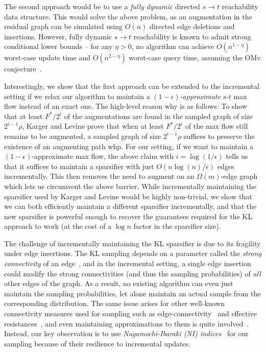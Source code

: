 \documentclass[11pt,a4paper]{article}
\newcommand{\eps}{\epsilon}
\begin{document}
The second approach would be to use a \emph{fully dynamic} directed $s\to t$ reachability data structure. This would solve the above problem, as  an augmentation in the residual graph can be simulated using $O(n)$ directed edge deletions and insertions. However, fully dynamic $s \to t$ reachability is known to admit strong conditional lower bounds -- for any $\eta > 0$, no algorithm can achieve $O(n^{1-\eta})$ worst-case update time and $O(n^{2-\eta})$ worst-case query time, assuming the OMv conjecture~\cite{HKNS15omv}.

Interestingly, we show that the first approach can be extended to the incremental setting if we relax our algorithm to maintain a \emph{$(1-\eps)$-approximate} $s$-$t$ max flow instead of an exact one.
The high-level reason why is as follows: To show that at least $F^*/2^i$ of the augmentations are found in the sampled graph of size $2^{i-1} \rho$, Karger and Levine prove that when at least $F^*/2^i$ of the max flow still remains to be augmented, a sampled graph of size $2^{i-1}\rho $ suffices to preserve the existence of an augmenting path whp. For our setting, if we want to maintain a $(1-\eps)$-approximate max flow, the above claim with $i = \log (1/\eps)$ tells us that it suffices to maintain a sparsifier with just $O(n \log (n) / \eps)$ edges incrementally.
This then removes the need to augment on an $\Omega(m)$-edge graph which lets us circumvent the above barrier.
While incrementally maintaining the sparsifier used by Karger and Levine would be highly non-trivial, we show that we can both efficiently maintain a different sparsifier incrementally, and that the new sparsifier is powerful enough to recover the guarantees required for the KL approach to work (at the cost of a $\log n$ factor in the sparsifier size).

The challenge of incrementally maintaining the KL sparsifier is due to its fragility under edge insertions. The KL sampling depends on a parameter called the \emph{strong connectivity} of an edge~\cite{BK15sampling}, and in the incremental setting, a single edge insertion could modify the strong connectivities (and thus the sampling probabilities) of \emph{all} other edges of the graph. As a result, no existing algorithm can even just maintain the sampling probabilities, let alone maintain an actual sample from the corresponding distribution. The same issue arises for other well-known connectivity measures used for sampling such as edge-connectivity~\cite{FHHP19sparsification} and effective resistances~\cite{SS11sparse}, and even maintaining approximations to them is quite involved~\cite{DurfeeGGP18, DGGP19schur, CGH20dynjtree, GaoLP21}. Instead, our key observation is to use \emph{Nagamochi-Ibaraki (NI) indices}~\cite{NI92sparsify} for our sampling because of their resilience to incremental updates.
\end{document}
